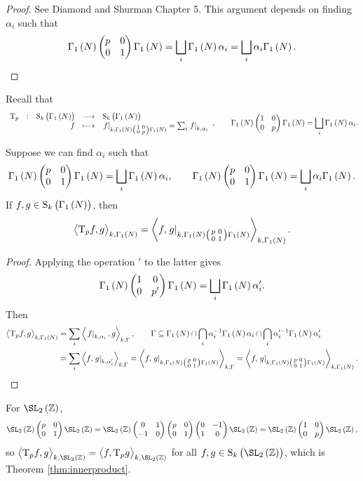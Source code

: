 \begin{proof}
See Diamond and Shurman Chapter 5. This argument depends on finding $ \alpha_i $ such that
$$ \Gamma_1\br{N}\twobytwo{p}{0}{0}{1}\Gamma_1\br{N} = \bigsqcup_i \Gamma_1\br{N}\alpha_i = \bigsqcup_i \alpha_i\Gamma_1\br{N}. $$
\end{proof}

Recall that
$$ \function[\T_p]{\S_k\br{\Gamma_1\br{N}}}{\S_k\br{\Gamma_1\br{N}}}{f}{\eval{f}_{k, \Gamma_1\br{N}\twobytwosmall{1}{0}{0}{p}\Gamma_1\br{N}} = \sum_i \eval{f}_{k, \alpha_i}}, \qquad \Gamma_1\br{N}\twobytwo{1}{0}{0}{p}\Gamma_1\br{N} = \bigsqcup_i \Gamma_1\br{N}\alpha_i. $$

\pagebreak

\begin{lemma}
Suppose we can find $ \alpha_i $ such that
$$ \Gamma_1\br{N}\twobytwo{p}{0}{0}{1}\Gamma_1\br{N} = \bigsqcup_i \Gamma_1\br{N}\alpha_i, \qquad \Gamma_1\br{N}\twobytwo{p}{0}{0}{1}\Gamma_1\br{N} = \bigsqcup_i \alpha_i\Gamma_1\br{N}. $$
If $ f, g \in \S_k\br{\Gamma_1\br{N}} $, then
$$ \abr{\T_pf, g}_{k, \Gamma_1\br{N}} = \abr{f, \eval{g}_{k, \Gamma_1\br{N}\twobytwosmall{p}{0}{0}{1}\Gamma_1\br{N}}}_{k, \Gamma_1\br{N}}. $$
\end{lemma}

\begin{proof}
Applying the operation $ ' $ to the latter gives
$$ \Gamma_1\br{N}\twobytwo{1}{0}{0}{p'}\Gamma_1\br{N} = \bigsqcup_i \Gamma_1\br{N}\alpha_i'. $$
Then
\begin{align*}
\abr{\T_pf, g}_{k, \Gamma_1\br{N}}
& = \sum_i \abr{\eval{f}_{k, \alpha_i}, g}_{k, \Gamma}, \qquad \Gamma \subseteq \Gamma_1\br{N} \cap \bigcap_i \alpha_i^{-1}\Gamma_1\br{N}\alpha_i \cap \bigcap_i \alpha_i'^{-1}\Gamma_1\br{N}\alpha_i' \\
& = \sum_i \abr{f, \eval{g}_{k, \alpha_i'}}_{k, \Gamma}
= \abr{f, \eval{g}_{k, \Gamma_1\br{N}\twobytwosmall{p}{0}{0}{1}\Gamma_1\br{N}}}_{k, \Gamma}
= \abr{f, \eval{g}_{k, \Gamma_1\br{N}\twobytwosmall{p}{0}{0}{1}\Gamma_1\br{N}}}_{k, \Gamma_1\br{N}}.
\end{align*}
\end{proof}

For $ \SL_2\br{\ZZ} $,
$$ \SL_2\br{\ZZ}\twobytwo{p}{0}{0}{1}\SL_2\br{\ZZ} = \SL_2\br{\ZZ}\twobytwo{0}{1}{-1}{0}\twobytwo{p}{0}{0}{1}\twobytwo{0}{-1}{1}{0}\SL_2\br{\ZZ} = \SL_2\br{\ZZ}\twobytwo{1}{0}{0}{p}\SL_2\br{\ZZ}, $$
so $ \abr{\T_pf, g}_{k, \SL_2\br{\ZZ}} = \abr{f, \T_pg}_{k, \SL_2\br{\ZZ}} $ for all $ f, g \in \S_k\br{\SL_2\br{\ZZ}} $, which is Theorem \ref{thm:innerproduct}.

